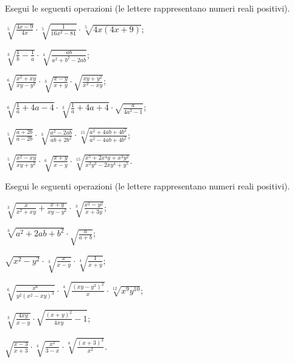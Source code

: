 \begin{esercizio}[\Ast]
 \label{ese:2.45}
Esegui le seguenti operazioni (le lettere rappresentano numeri reali positivi).
 \begin{enumeratea}
 \item $\sqrt[5]{\frac{4x-9}{4x}}\cdot\sqrt[5]{\frac{1}{16x^2-81}}\cdot\sqrt[5]{4x(4x+9)}$;
 \item $\sqrt[3]{\frac{1}{b}-\frac{1}{a}}\cdot\sqrt[4]{\frac{ab}{a^2+b^2-2ab}}$;
 \item $\sqrt[6]{\frac{x^2+xy}{xy-y^2}}\cdot\sqrt[3]{\frac{x-y}{x+y}}\cdot\sqrt{\frac{xy+y^2}{x^2-xy}}$;
 \item $\sqrt[6]{\frac{1}{a}+4a-4}\cdot\sqrt[3]{\frac{1}{a}+4a+4}\cdot\sqrt{\frac{a}{4a^2-1}}$;
 \item $\sqrt[5]{\frac{a+2b}{a-2b}}\cdot\sqrt[3]{\frac{a^2-2ab}{ab+2b^2}}\cdot\sqrt[15]{\frac{a^2+4ab+4b^2}{a^2-4ab+4b^2}}$;
 \item $\sqrt[5]{\frac{x^2-xy}{xy+y^2}}\cdot\sqrt[6]{\frac{x+y}{x-y}}\cdot\sqrt[15]{\frac{x^5+2x^4y+x^3y^2}{x^2y^3-2xy^4+y^5}}$.
 \end{enumeratea}
\end{esercizio}

\begin{esercizio}[\Ast]
 \label{ese:2.46}
Esegui le seguenti operazioni (le lettere rappresentano numeri reali positivi).
 \begin{enumeratea}
 \item $\sqrt[3]{\frac{x}{x^2+xy}+\frac{x+y}{xy-y^2}}\cdot\sqrt[3]{\frac{x^2-y^2}{x+3y}}$;
 \item $\sqrt[3]{a^2+2ab+b^2}\cdot\sqrt{\frac{a}{a+b}}$;
 \item $\sqrt{x^2-y^2}\cdot\sqrt[3]{\frac{x}{x-y}}\cdot\sqrt[4]{\frac{1}{x+y}}$;
 \item $\sqrt[6]{\frac{x^6}{y^2(x^2-xy)^3}}\cdot\sqrt[4]{\frac{(xy-y^2)^2}{x}}\cdot\sqrt[12]{x^9y^{10}}$;
 \item $\sqrt[3]{\frac{4xy}{x-y}}\cdot\sqrt{\frac{(x+y)^2}{4xy}-1}$;
 \item $\sqrt{\frac{x-3}{x+3}}\cdot\sqrt[4]{\frac{x^2}{3-x}}\cdot\sqrt[8]{\frac{(x+3)^3}{x^2}}$.
 \end{enumeratea}
\end{esercizio}

